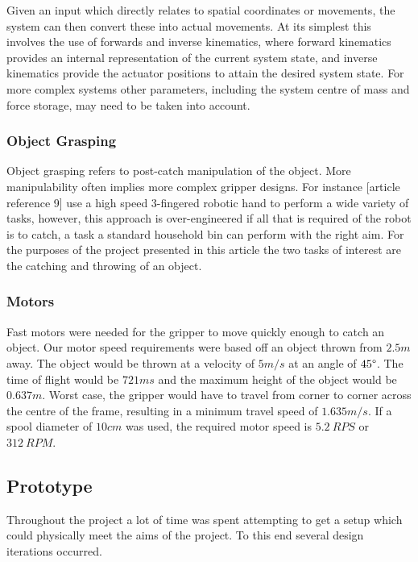 \documentclass[conference]{IEEEtran}
\begin{document}
	Given an input which directly relates to spatial coordinates or movements, the system can then convert these into actual movements. At its simplest this involves the use of forwards and inverse kinematics, where forward kinematics provides an internal representation of the current system state, and inverse kinematics provide the actuator positions to attain the desired system state. For more complex systems other parameters, including the system centre of mass and force storage, may need to be taken into account. 
	
	\subsubsection{Object Grasping}
	Object grasping refers to post-catch manipulation of the object. More manipulability often implies more complex gripper designs. For instance [article reference 9] use a high speed 3-fingered robotic hand to perform a wide variety of tasks, however, this approach is over-engineered if all that is required of the robot is to catch, a task a standard household bin can perform with the right aim.
	For the purposes of the project presented in this article the two tasks of interest are the catching and throwing of an object.
	
	\subsubsection{Motors}
	Fast motors were needed for the gripper to move quickly enough to catch an object. Our motor speed requirements were based off an object thrown from $2.5m$ away. The object would be thrown at a velocity of $5m/s$ at an angle of $45\degree$. The time of flight would be $721ms$ and the maximum height of the object would be $0.637m$. Worst case, the gripper would have to travel from corner to corner across the centre of the frame, resulting in a minimum travel speed of $1.635m/s$. If a spool diameter of $10cm$ was used, the required motor speed is $5.2\ RPS$ or $312\ RPM$.
	

	\subsection{Prototype}
	Throughout the project a lot of time was spent attempting to get a setup which could physically meet the aims of the project. To this end several design iterations occurred.
	
\end{document}
